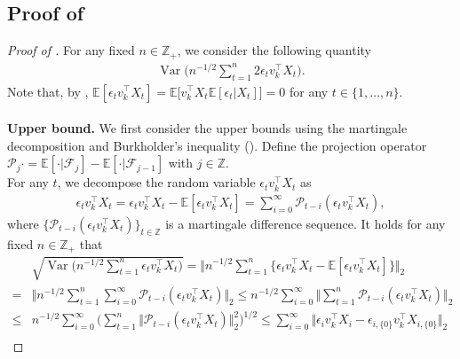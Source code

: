 \documentclass[11pt]{article}
\DeclareMathOperator*{\var}{Var}
\theoremstyle{plain}
\theoremstyle{definition}
\begin{document}
\subsection[]{Proof of }

\begin{proof}[Proof of ]
For any fixed $n \in \mathbb{Z}_+$, we consider the following quantity
\begin{align*}
    \var\bigg(n^{-1/2}\sum_{t = 1}^n2\epsilon_t v_k^{\top}X_t \bigg).
\end{align*}
Note that, by , $\mathbb E[\epsilon_t v_k^{\top}X_t] = \mathbb E\big[v_k^{\top}X_t\mathbb E[\epsilon_t|X_t ]\big] = 0$ for any $t \in \{1, \dots, n\}$. 
\\
\\
{\bf Upper bound.}
We first consider the upper bounds using the martingale decomposition and Burkholder's inequality ().  
Define the projection operator $\mathcal{P}_j\cdot = \mathbb{E}[\cdot|\mathcal{F}_j] - \mathbb{E}[\cdot| \mathcal{F}_{j-1}]$ with $j \in \mathbb{Z}$.
\
\\
For any $t$, we decompose the random variable $\epsilon_t v_k^{\top}X_t$ as
    \begin{align*}
        \epsilon_tv_k^{\top}X_t = \epsilon_tv_k^{\top}X_t - \mathbb{E}[\epsilon_tv_k^{\top}X_t] =  \sum_{i = 0}^{\infty}\mathcal{P}_{t-i}(\epsilon_tv_k^{\top}X_t),
    \end{align*}
    where $\{\mathcal{P}_{t-i}(\epsilon_tv_k^{\top}X_t)\}_{t \in \mathbb{Z}}$ is a martingale difference sequence.
    It holds for any fixed $n \in \mathbb{Z}_+$ that 
    \begin{align}\label{eq:lrv_ub_part1}
        &\sqrt{\var\bigg(n^{-1/2}\sum_{t = 1}^n \epsilon_tv_k^{\top}X_t\bigg)} = \bigg\Vert n^{-1/2}\sum_{t=1}^n\big\{\epsilon_tv_k^{\top}X_t - \mathbb{E}[\epsilon_tv_k^{\top}X_t]\big\} \bigg\Vert_2 \nonumber \\
        =& \bigg\Vert n^{-1/2}\sum_{t=1}^n\sum_{i = 0}^{\infty}\mathcal{P}_{t-i}(\epsilon_tv_k^{\top}X_t) \bigg\Vert_2 \leq n^{-1/2}\sum_{i = 0}^{\infty}\bigg\Vert \sum_{t=1}^n\mathcal{P}_{t-i}(\epsilon_tv_k^{\top}X_t) \bigg\Vert_2 \nonumber \\
        \leq& n^{-1/2}\sum_{i = 0}^{\infty}\bigg( \sum_{t=1}^n\big\Vert \mathcal{P}_{t-i}(\epsilon_tv_k^{\top}X_t) \big\Vert_2^2\bigg)^{1/2} \leq \sum_{i = 0}^{\infty}\big\Vert \epsilon_iv_k^{\top}X_i - \epsilon_{i,\{0\}}v_k^{\top}X_{i,\{0\}} \big\Vert_{2} \nonumber \\

\end{align}
\end{proof}
\end{document}
